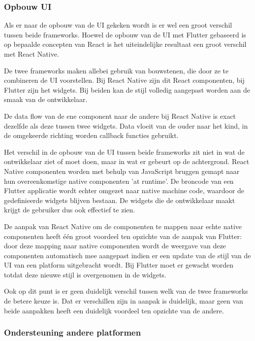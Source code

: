 \subsubsection{Opbouw UI}

Als er naar de opbouw van de UI gekeken wordt is er wel een groot verschil tussen beide frameworks. Hoewel de opbouw van de UI met Flutter gebaseerd is op bepaalde concepten van React is het uiteindelijke resultaat een groot verschil met React Native.

De twee frameworks maken allebei gebruik van bouwstenen, die door ze te combineren de UI voorstellen. Bij React Native zijn dit React componenten, bij Flutter zijn het widgets. Bij beiden kan de stijl volledig aangepast worden aan de smaak van de ontwikkelaar. 

De data flow van de ene component naar de andere bij React Native is exact dezelfde als deze tussen twee widgets. Data vloeit van de ouder naar het kind, in de omgekeerde richting worden callback functies gebruikt.

Het verschil in de opbouw van de UI tussen beide frameworks zit niet in wat de ontwikkelaar ziet of moet doen, maar in wat er gebeurt op de achtergrond. React Native componenten worden met behulp van JavaScript bruggen gemapt naar hun overeenkomstige native componenten 'at runtime'. De broncode van een Flutter applicatie wordt echter omgezet naar native machine code, waardoor de gedefinieerde widgets blijven bestaan. De widgets die de ontwikkelaar maakt krijgt de gebruiker dus ook effectief te zien. 

De aanpak van React Native om de componenten te mappen naar echte native componenten heeft één groot voordeel ten opzichte van de aanpak van Flutter: door deze mapping naar native componenten wordt de weergave van deze componenten automatisch mee aangepast indien er een update van de stijl van de UI van een platform uitgebracht wordt. Bij Flutter moet er gewacht worden totdat deze nieuwe stijl is overgenomen in de widgets. 

Ook op dit punt is er geen duidelijk verschil tussen welk van de twee frameworks de betere keuze is. Dat er verschillen zijn in aanpak is duidelijk, maar geen van beide aanpakken heeft een duidelijk voordeel ten opzichte van de andere. 

\subsubsection{Ondersteuning andere platformen}

